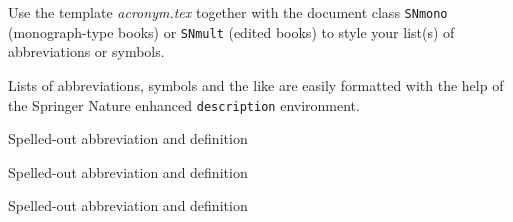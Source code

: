
Use the template \emph{acronym.tex} together with the document class \verb|SNmono| (monograph-type books) or \verb|SNmult| (edited books) to style your list(s) of abbreviations or symbols.

Lists of abbreviations, symbols and the like are easily formatted with the help of the Springer Nature enhanced \verb|description| environment.

\begin{description}[CABR]
\item[ABC]{Spelled-out abbreviation and definition}
\item[BABI]{Spelled-out abbreviation and definition}
\item[CABR]{Spelled-out abbreviation and definition}
\end{description}